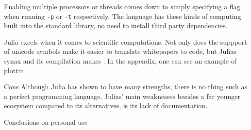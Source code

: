 Enabling multiple processors or threads comes down to simply specifying a flag when running \texttt{-p} or \texttt{-t} respectively. The language has these kinds of computing built into the standard library, no need to install third party dependencies. 

Julia excels when it comes to scientific computations. Not only does the suppport of unicode symbols make it easier to translate whitepapers to code, but Julias synax and its compilation makes . In the appendix, one can see an example of plottin 



Cons
Although Julia has shown to have many strengths, there is no thing such as a perfect programming language. Julias' main weaknesses besides a far younger ecosystem compared to its alternatives, is its lack of documentation. 



Conclusions on personal use 


